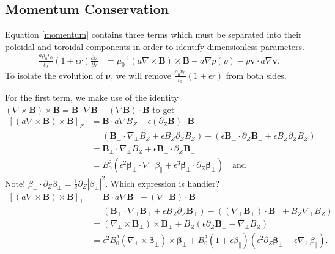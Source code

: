 \documentclass{article}
\newcommand{\para}{\parallel}
\newcommand{\ep}{\epsilon}
\newcommand{\np}{\nabla_\perp}
\newcommand{\p}{\partial}
\newcommand{\deriv}[2]{\frac{\p #1}{\p #2}}
\newcommand{\pth} [1] {\left( #1 \right) }
\newcommand{\br} [1] {\left[ #1 \right] }
\begin{document}
\subsection{Momentum Conservation}
Equation \eqref{momentum} contains three terms which must be separated into their poloidal and toroidal components in order to identify dimensionless parameters.
\begin{align*}
    \frac{a\rho_0v_0}{t_0} \pth{1+\ep r} \deriv{\bm{\nu}}{\tau} &= \mu_0^{-1} \pth{a\nabla\times \bm{B}} \times \bm{B} - a\nabla p(\rho) - \rho \bm{v}\cdot a\nabla \bm{v}. 
\end{align*}
To isolate the evolution of $\bm{\nu}$, we will remove $\frac{\rho_0v_0}{t_0} \pth{1+\ep r}$ from both sides. 

For the first term, we make use of the identity $\pth{\nabla\times\bm{B}}\times\bm{B} = \bm{B}\cdot\nabla\bm{B} - \pth{\nabla\bm{B}}\cdot\bm{B}$ to get 
\begin{align*}
    \br{\pth{a\nabla\times\bm{B}}\times\bm{B}}_Z &= \bm{B}\cdot a\nabla B_Z - \ep\pth{\p_Z\bm{B}}\cdot\bm{B} \\ 
    &= \pth{\bm{B}_\perp\cdot\np B_Z + \ep B_Z\p_Z B_Z} - \pth{\ep\bm{B}_\perp\cdot\p_Z\bm{B}_\perp + \ep B_Z\p_ZB_Z} \\ 
    &= \bm{B}_\perp\cdot \np B_Z + \ep\bm{B}_\perp\cdot \p_Z\bm{B}_\perp \\ 
    &= B_0^2 \pth{\ep^2\bm{\beta}_\perp\cdot\np\beta_\para + \ep^3 \bm{\beta}_\perp\cdot\p_Z\bm{\beta}_\perp}  \quad\text{and}
\end{align*}
Note! $\beta_\perp\cdot\p_Z\beta_\perp = \frac{1}{2}\p_Z|\beta_\perp|^2$. Which expression is handier? 
\begin{align*}
    \br{\pth{a\nabla\times\bm{B}}\times\bm{B}}_\perp &= \bm{B}\cdot a\nabla\bm{B}_\perp - \pth{\np\bm{B}}\cdot\bm{B} \\ 
    &= \pth{\bm{B}_\perp\cdot\np\bm{B}_\perp + \ep B_Z\p_Z\bm{B}_\perp} - \pth{\pth{\np\bm{B}_\perp} \cdot\bm{B}_\perp + B_Z\np B_Z} \\ 
    &= \pth{\np\times\bm{B}_\perp}\times\bm{B}_\perp + B_Z\pth{\ep\p_Z\bm{B}_\perp - \np B_Z} \\ 
    &= \ep^2 B_0^2 \pth{\np\times\bm{\beta}_\perp}\times\bm{\beta}_\perp + B_0^2 \pth{1+\ep\beta_\para} \pth{\ep^2\p_Z\bm{\beta}_\perp - \ep\np\beta_\para}. 
\end{align*}
\end{document}
